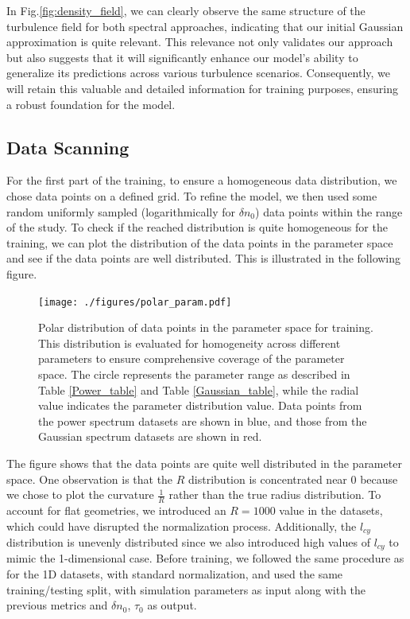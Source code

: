 \documentclass[11pt,openany]{report}
\begin{document}
\begin{multicols}{2}
    In Fig.\ref{fig:density_field}, we can clearly observe the same structure of the turbulence field for both spectral approaches, indicating that our initial Gaussian approximation is quite relevant. This relevance not only validates our approach but also suggests that it will significantly enhance our model's ability to generalize its predictions across various turbulence scenarios. Consequently, we will retain this valuable and detailed information for training purposes, ensuring a robust foundation for the model.

    \subsection{Data Scanning}

    For the first part of the training, to ensure a homogeneous data distribution, we chose data points on a defined grid. To refine the model, we then used some random uniformly sampled (logarithmically for $\delta n_0$) data points within the range of the study. To check if the reached distribution is quite homogeneous for the training, we can plot the distribution of the data points in the parameter space and see if the data points are well distributed. This is illustrated in the following figure.

    \begin{figure}[H]
        \centering
        \texttt{[image: ./figures/polar\_param.pdf]}
        \caption{Polar distribution of data points in the parameter space for training. This distribution is evaluated for homogeneity across different parameters to ensure comprehensive coverage of the parameter space. The circle represents the parameter range as described in Table \ref{Power_table} and Table \ref{Gaussian_table}, while the radial value indicates the parameter distribution value. Data points from the power spectrum datasets are shown in blue, and those from the Gaussian spectrum datasets are shown in red.}
        \label{params_distr}
    \end{figure}
    The figure shows that the data points are quite well distributed in the parameter space. One observation is that the $R$ distribution is concentrated near 0 because we chose to plot the curvature $\frac{1}{R}$ rather than the true radius distribution. To account for flat geometries, we introduced an $R = 1000$ value in the datasets, which could have disrupted the normalization process. Additionally, the $l_{cy}$ distribution is unevenly distributed since we also introduced high values of $l_{cy}$ to mimic the 1-dimensional case. Before training, we followed the same procedure as for the 1D datasets, with standard normalization, and used the same training/testing split, with simulation parameters as input along with the previous metrics and $\delta n_0$, $\tau_0$ as output.


\end{multicols}
\end{document}
